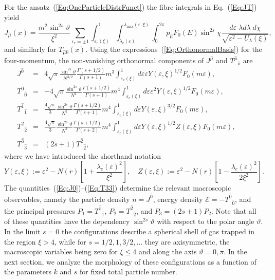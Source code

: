 \documentclass{appolb}
\begin{document}
For the ansatz~(\ref{Eq:OneParticleDistrFunct}) the fibre integrals in Eq.~(\ref{Eq:JT}) yield
\begin{equation}
\label{Eq:Jmu}
J_{\hat{\mu}}(x) = \frac{m^2\sin^{2s}\vartheta}{\xi^2}
\sum_{\epsilon_r = \pm 1}\int_{\varepsilon_{\text{c}}(\xi)}^1 \int_{\lambda_{\text{c}}(\varepsilon)}^{\lambda_{\text{max}}(\varepsilon,\xi)} 
\int_0^{2\pi} p_{\hat{\mu}} F_0(E) \sin^{2s}\chi \frac{d\varepsilon\; \lambda d\lambda\;d\chi}{\sqrt{\varepsilon^2 - U_\lambda(\xi)}},
\end{equation}
and similarly for $T_{\hat{\mu}\hat{\nu}}(x)$. Using the expressions~(\ref{Eq:OrthonormalBasis}) for the four-momentum, the non-vanishing orthonormal components of $J^{\hat{\mu}}$ and $T^{\hat{\mu}}{}_{\hat{\nu}}$ are
\begin{eqnarray}
\label{Eq:J0}
J^{\hat{0}} &=& 4\sqrt{\pi} \frac{\sin^{2s}\vartheta}{N^{3/2}} \frac{\Gamma(s+1/2)}{\Gamma(s+1)} m^3\int_{\varepsilon_{\text{c}}(\xi)}^1 d\varepsilon \varepsilon Y(\varepsilon,\xi)^{1/2}
F_0(m\varepsilon),\\
\label{Eq:T00}
T^{\hat{0}}{}_{\hat{0}} &=& -4\sqrt{\pi} \frac{\sin^{2s}\vartheta}{N^2} \frac{\Gamma(s+1/2)}{\Gamma(s+1)} m^4\int_{\varepsilon_{\text{c}}(\xi)}^1 d\varepsilon \varepsilon^2 
Y(\varepsilon,\xi)^{1/2}
F_0(m\varepsilon),\\
\label{Eq:T11}
T^{\hat{1}}{}_{\hat{1}} &=& \frac{4\sqrt{\pi}}{3} \frac{\sin^{2s}\vartheta}{N^2} \frac{\Gamma(s+1/2)}{\Gamma(s+1)} m^4\int_{\varepsilon_{\text{c}}(\xi)}^1 d\varepsilon 
Y(\varepsilon,\xi)^{3/2}
F_0(m\varepsilon),\\
\label{Eq:T22}
T^{\hat{2}}{}_{\hat{2}} &=& \frac{4\sqrt{\pi}}{3} \frac{\sin^{2s}\vartheta}{N^2} \frac{\Gamma(s+1/2)}{\Gamma(s+2)} m^4\int_{\varepsilon_{\text{c}}(\xi)}^1 d\varepsilon 
Y(\varepsilon,\xi)^{1/2}
Z(\varepsilon,\xi) F_0(m\varepsilon),
\qquad\\
\label{Eq:T33}
T^{\hat{3}}{}_{\hat{3}}  &=& (2s+1)T^{\hat{2}}{}_{\hat{2}},
\end{eqnarray}
where we have introduced the shorthand notation
\begin{equation}
Y(\varepsilon,\xi) := \varepsilon^2 - N(r)\left[1 + \frac{\lambda_c(\varepsilon)^2}{\xi^2} \right],\quad
Z(\varepsilon,\xi) := \varepsilon^2 - N(r)\left[1 - \frac{\lambda_c(\varepsilon)^2}{2\xi^2} \right].
\end{equation}
The quantities~(\ref{Eq:J0})--(\ref{Eq:T33}) determine the relevant macroscopic observables, namely the particle density $n = J^{\hat{0}}$, energy density $\mathcal{E} = -T^{\hat{0}}{}_{\hat{0}}$, and the principal pressures $P_1 = T^{\hat{1}}{}_{\hat{1}}$, $P_2 = T^{\hat{2}}{}_{\hat{2}}$, and $P_3 = (2s+1)P_2$. Note that all of these quantities have the dependency $\sin^{2s}\vartheta$ with respect to the polar angle $\vartheta$. In the limit $s = 0$ the configurations describe a spherical shell of gas trapped in the region $\xi > 4$, while for $s = 1/2,1,3/2,\ldots$ they are axisymmetric, the macroscopic variables being zero for $\xi \leq 4$ and along the axis $\vartheta = 0,\pi$. In the next section, we analyze the morphology of these configurations as a function of the parameters $k$ and $s$ for fixed total particle number.
\end{document}
